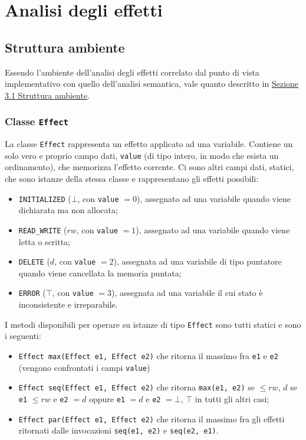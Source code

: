 \documentclass[../report.tex]{subfiles}
\begin{document}
\chapter{Analisi degli effetti}\label{c:analisi-effetti}
\section{Struttura ambiente}\label{s:struttura-ambiente-effetti}
Essendo l'ambiente dell'analisi degli effetti correlato dal punto di vista implementativo con quello dell'analisi semantica, vale quanto descritto in \hyperref[s:struttura-ambiente]{Sezione 3.1 Struttura ambiente}.

\subsection[Classe Effect]{Classe \texttt{Effect}}\label{ss:effect-effetti}
La classe \verb|Effect| rappresenta un effetto applicato ad una variabile.
Contiene un solo vero e proprio campo dati, \verb|value| (di tipo intero, in modo che esista un ordinamento), che memorizza l'effetto corrente.
Ci sono altri campi dati, statici, che sono istanze della stessa classe e rappresentano gli effetti possibili:
\begin{itemize}
    \item \verb|INITIALIZED| ($\bot$, con \verb|value| $= 0$), assegnato ad una variabile quando viene dichiarata ma non allocata;
    \item \verb|READ_WRITE| ($rw$, con \verb|value| $= 1$), assegnato ad una variabile quando viene letta o scritta;
    \item \verb|DELETE| ($d$, con \verb|value| $= 2$), assegnata ad una variabile di tipo puntatore quando viene cancellata la memoria puntata;
    \item \verb|ERROR| ($\top$, con \verb|value| $= 3$), assegnata ad una variabile il cui stato è inconsistente e irreparabile.
\end{itemize}
I metodi disponibili per operare su istanze di tipo \verb|Effect| sono tutti statici e sono i seguenti:
\begin{itemize}
    \item \verb|Effect max(Effect e1, Effect e2)| che ritorna il massimo fra \verb|e1| e \verb|e2| (vengono confrontati i campi \verb|value|)
    \item \verb|Effect seq(Effect e1, Effect e2)| che ritorna \verb|max(e1, e2)| se $\leq{} rw$, $d$ se \verb|e1| $\leq{} rw$ e \verb|e2| $= d$ oppure \verb|e1| $= d$ e \verb|e2| $= \bot$, $\top$ in tutti gli altri casi;
    \item \verb|Effect par(Effect e1, Effect e2)| che ritorna il massimo fra gli effetti ritornati dalle invocazioni \verb|seq(e1, e2)| e \verb|seq(e2, e1)|.
\end{itemize}
\end{document}
